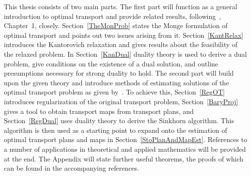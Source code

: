 This thesis consists of two main parts. The first part will function as a general introduction to optimal transport and provide related results, following\ \cite{San2015}, Chapter~1, closely. Section~\ref{TheMonProb} states the Monge formulation of optimal transport and points out two issues arising from it. Section~\ref{KantRelax} introduces the Kantorovich relaxation and gives results about the feasibility of the relaxed problem. In Section~\ref{KanDual} duality theory is used to derive a dual problem, give conditions on the existence of a dual solution, and outline presumptions necessary for strong duality to hold. The second part will build upon the given theory and introduce methods of estimating solutions of the optimal transport problem as given by\ \cite{Seg2018}. To achieve this, Section~\ref{RegOT} introduces regularization of the original transport problem, Section~\ref{BaryProj} gives a tool to obtain transport maps from transport plans, and Section~\ref{RegDual} uses duality theory to derive the Sinkhorn algorithm. This algorithm is then used as a starting point to expand onto the estimation of optimal transport plans and maps in Section~\ref{StoPlanAndMapEst}. References to a number of applications in theoretical and applied mathematics will be provided at the end. The Appendix will state further useful theorems, the proofs of which can be found in the accompanying references.